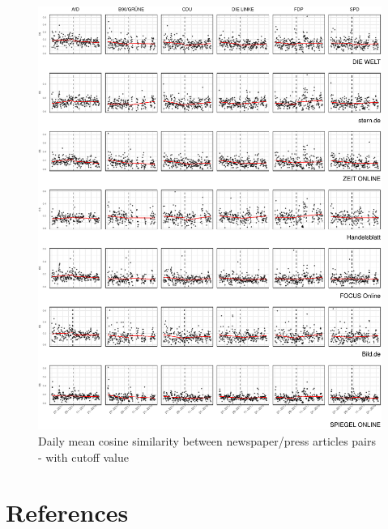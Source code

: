 \documentclass[
  12pt,
]{article}
\begin{document}
\begin{figure}

{\centering \includegraphics[width=1\linewidth]{main_text_files/figure-latex/Daily mean cosine similarity - cutoff value-1} 

}

\caption{Daily mean cosine similarity between newspaper/press articles pairs - with cutoff value \label{fig:mean_cosine_sim_rd}}\label{fig:Daily mean cosine similarity - cutoff value}
\end{figure}

\newpage

\hypertarget{references}{%
\section*{References}\label{references}}
\end{document}
